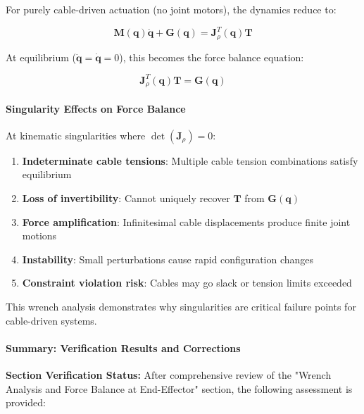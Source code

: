For purely cable-driven actuation (no joint motors), the dynamics reduce to:

\begin{equation}
\mathbf{M}(\mathbf{q}) \ddot{\mathbf{q}} + \mathbf{G}(\mathbf{q}) = \mathbf{J}_{\rho}^T(\mathbf{q}) \mathbf{T}
\end{equation}

At equilibrium ($\ddot{\mathbf{q}} = \dot{\mathbf{q}} = 0$), this becomes the force balance equation:

\begin{equation}
\mathbf{J}_{\rho}^T(\mathbf{q}) \mathbf{T} = \mathbf{G}(\mathbf{q})
\end{equation}

\paragraph{Singularity Effects on Force Balance}

At kinematic singularities where $\det(\mathbf{J}_{\rho}) = 0$:

\begin{enumerate}
    \item \textbf{Indeterminate cable tensions}: Multiple cable tension combinations satisfy equilibrium
    \item \textbf{Loss of invertibility}: Cannot uniquely recover $\mathbf{T}$ from $\mathbf{G}(\mathbf{q})$
    \item \textbf{Force amplification}: Infinitesimal cable displacements produce finite joint motions
    \item \textbf{Instability}: Small perturbations cause rapid configuration changes
    \item \textbf{Constraint violation risk}: Cables may go slack or tension limits exceeded
\end{enumerate}

This wrench analysis demonstrates why singularities are critical failure points for cable-driven systems.

\paragraph{Summary: Verification Results and Corrections}

\textbf{Section Verification Status:} After comprehensive review of the "Wrench Analysis and Force Balance at End-Effector" section, the following assessment is provided:

